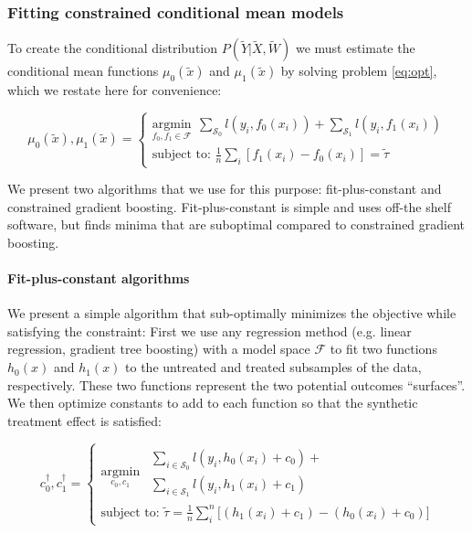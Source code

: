 \subsubsection{Fitting constrained conditional mean models}
\label{sec:fitting}

To create the conditional distribution $P(\tilde Y| \tilde X, \tilde W)$ we must estimate the conditional mean functions $\mu_0(\tilde x)$ and $\mu_1(\tilde x)$ by solving problem \ref{eq:opt}, which we restate here for convenience:

\begin{equation}
\mu_0(\tilde x), \mu_1(\tilde x) = 
\begin{cases}
\underset{f_0, f_1 \in \mathcal{F}}{\text{argmin}} \ \  \sum_{\mathcal{S}_0}  l(y_i, f_0(x_i)) + \sum_{\mathcal{S}_1}  l(y_i, f_1(x_i)) \\
\text{subject to:   } \frac{1}{n}\sum_i[f_1(x_i) - f_0(x_i)] = \tilde \tau
\end{cases}
\end{equation}

We present two algorithms that we use for this purpose: fit-plus-constant and constrained gradient boosting. Fit-plus-constant is simple and uses off-the shelf software, but finds minima that are suboptimal compared to constrained gradient boosting. 

\paragraph{Fit-plus-constant algorithms}
We present a simple algorithm that sub-optimally minimizes the objective while satisfying the constraint: First we use any regression method (e.g. linear regression, gradient tree boosting) with a model space $\mathcal{F}$ to fit two functions $h_0(x)$ and $h_1(x)$ to the untreated and treated subsamples of the data, respectively. These two functions represent the two potential outcomes ``surfaces''. We then optimize constants to add to each function so that the synthetic treatment effect is satisfied:

\begin{equation}
c^\dagger_0, c^\dagger_1 =
\begin{cases}
\underset{c_0, c_1}{\text{argmin}} \ \  
\begin{array}{l}
\sum_{i \in \mathcal{S}_0}  l(y_i, h_0(x_i) + c_0) + \\
\sum_{i \in \mathcal{S}_1 } l(y_i, h_1(x_i) + c_1) 
\end{array} \\
\text{subject to:   } \tilde{\tau} = \frac{1}{n}\sum_i^n \big[(h_1(x_i) + c_1) - (h_0(x_i) + c_0)\big]
\label{eq:opt-proj-consts}
\end{cases}
\end{equation}

